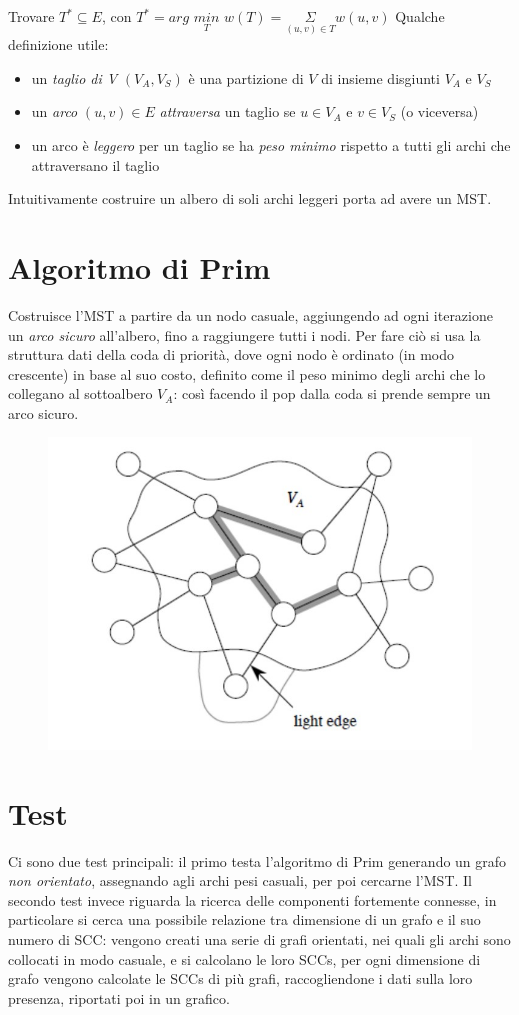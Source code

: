 \documentclass{article}
\begin{document}
Trovare $T^{*} \subseteq E$,  con $ T^{*} = arg$ $\underset{T}{min}$ $w(T) = \underset{(u, v) \in T}{\Sigma} w(u, v)$
\newline
Qualche definizione utile:
\begin{itemize}
	\item un \emph{taglio di V} $(V_A, V_S)$ è una partizione di $V$ di insieme disgiunti $V_A$ e $V_S$
	\item un \emph{arco} $(u, v) \in E$ \emph{attraversa} un taglio se $u \in V_A$ e $v \in V_S$ (o viceversa)
	\item un arco è \emph{leggero} per un taglio se ha \emph{peso minimo} rispetto a tutti gli archi che attraversano il taglio
\end{itemize}
Intuitivamente costruire un albero di soli archi leggeri porta ad avere un MST.
\newpage
\section{Algoritmo di Prim}
Costruisce l'MST a partire da un nodo casuale, aggiungendo ad ogni iterazione un \emph{arco sicuro} all'albero, fino a raggiungere tutti i nodi.
Per fare ciò si usa la struttura dati della coda di priorità, dove ogni nodo è ordinato (in modo crescente) in base al suo costo, definito come il peso minimo degli archi che lo collegano al sottoalbero $V_A$: così facendo il pop dalla coda si prende sempre un arco sicuro.

\begin{figure}[!h]
\centering
\includegraphics[width=0.7\linewidth]
{"./prim_example.jpg"}
\label{graph}
\end{figure}

\section{Test}
Ci sono due test principali: il primo testa l'algoritmo di Prim generando un grafo \emph{non orientato}, assegnando agli archi pesi casuali, per poi cercarne l'MST.\newline
Il secondo test invece riguarda la ricerca delle componenti fortemente connesse, in particolare si cerca una possibile relazione tra dimensione di un grafo e il suo numero di SCC: vengono creati una serie di grafi orientati, nei quali gli archi sono collocati in modo casuale, e si calcolano le loro SCCs, per ogni dimensione di grafo vengono calcolate le SCCs di più grafi, raccogliendone i dati sulla loro presenza, riportati poi in un grafico.
\end{document}
